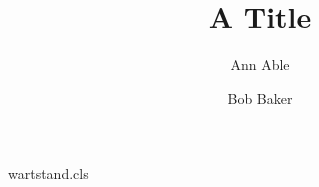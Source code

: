 \begin{filecontents*}[overwrite]{wartstand.cls}
\let\addresses\@empty
\renewcommand{\author}[2][]{\g@addto@macro\addresses{\@xauthor{#2}}\gdef\@author{#2}}
\newcommand{\address}[2][]{\g@addto@macro\addresses{\@xaddress{#1}{#2}}}
\def\inst#1{\unskip$^{#1}$}
\def\@xauthor#1{\par\noindent #1\par}
\def\@xaddress#1#2{\par\noindent #1 #2\par}
\AtEndDocument{\addresses}
\end{filecontents*}
\documentclass{wartstand}

\title{A Title}
\author[A. Able]{Ann Able}
\author[ ]{Bob Baker}
\address[\inst{1}]{Univ A, Town}
\address[\inst{2}]{Lab B, City}
\maketitle
Body.

